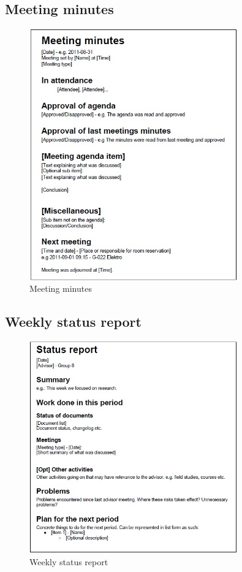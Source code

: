 	\newpage
	\subsection{Meeting minutes}
		\begin{figure}[htb]
			\centering
			\includegraphics[width=0.8\textwidth]{appendix/meeting_minutes.jpg}
			\caption{Meeting minutes}
			\label{fig:meeting-minutes}
		\end{figure}
	
	\newpage
	\subsection{Weekly status report}
		\begin{figure}[htb]
			\centering
			\includegraphics[width=0.8\textwidth]{appendix/weekly_status_report.jpg}
			\caption{Weekly status report}
			\label{fig:weekly-status-report}
		\end{figure}

